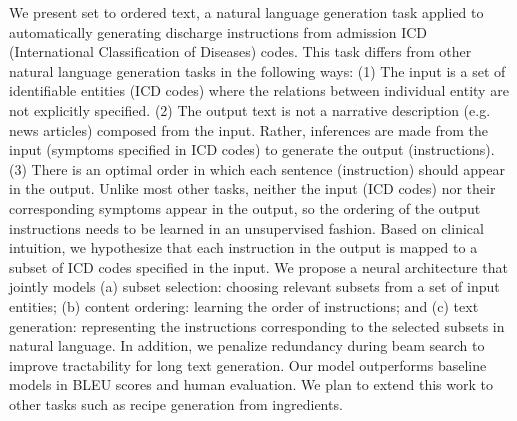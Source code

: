 We present set to ordered text, a natural language generation task applied to automatically generating discharge instructions from admission ICD (International Classification of Diseases) codes. 
This task differs from other natural language generation tasks in the following ways: 
(1) The input is a set of identifiable entities (ICD codes) where the relations between individual entity are not explicitly specified. 
(2) The output text is not a narrative description (e.g. news articles) composed from the input. Rather, inferences are made from the input (symptoms specified in ICD codes) to generate the output (instructions). 
(3) There is an optimal order in which each sentence (instruction) should appear in the output. Unlike most other tasks, neither the input (ICD codes) nor their corresponding symptoms appear in the output, so the ordering of the output instructions needs to be learned in an unsupervised fashion. 
Based on clinical intuition, we hypothesize that each instruction in the output is mapped to a subset of ICD codes specified in the input.
We propose a neural architecture that jointly models (a) subset selection: choosing relevant subsets from a set of input entities; (b) content ordering: learning the order of instructions; and (c) text generation:  representing the instructions corresponding to the selected subsets in natural language. In addition, we penalize redundancy during beam search to improve tractability for long text generation. Our model outperforms baseline models in BLEU scores and human evaluation. We plan to extend this work to other tasks such as recipe generation from ingredients.